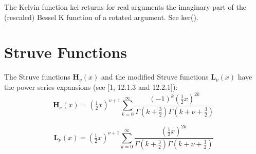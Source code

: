 \vpara
The Kelvin function kei returns for real arguments the imaginary part of the (rescaled) Bessel K function of a rotated argument. See ker().




\newpage

\section{Struve Functions}
\label{StruveFunctions4MpMath}

The Struve functions $\textbf{H}_{\nu}(x)$ and the modified Struve functions $\textbf{L}_{\nu}(x)$ have the power series expansions (see \citet{abramowitz_handbook_1970} [1, 12.1.3 and 12.2.1]):
\begin{equation}
\textbf{H}_{\nu}(x) = \left(\tfrac{1}{2}x\right)^{\nu+1} \sum_{k=0}^\infty \frac{(-1)^{k}\left(\tfrac{1}{2}x\right)^{2k}}{\Gamma\left(k+\tfrac{3}{2}\right) \Gamma\left(k+\nu+\tfrac{3}{2}\right)}
\end{equation}


\begin{equation}
\textbf{L}_{\nu}(x) = \left(\tfrac{1}{2}x\right)^{\nu+1} \sum_{k=0}^\infty \frac{\left(\tfrac{1}{2}x\right)^{2k}}{\Gamma\left(k+\tfrac{3}{2}\right) \Gamma\left(k+\nu+\tfrac{3}{2}\right)}
\end{equation}

